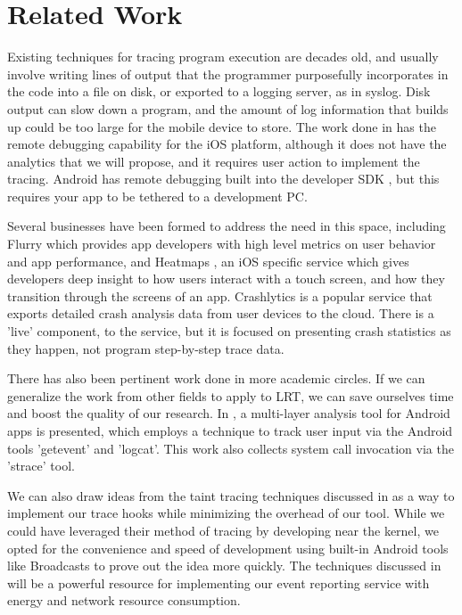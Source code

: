 \documentclass{acm_proc_article-sp}
\begin{document}
\section{Related Work}
Existing techniques for tracing program execution are decades old, and usually 
involve writing lines of output that the programmer purposefully incorporates 
in the code into a file on disk, or exported to a logging server, as in syslog. 
Disk output can slow down a program, and the amount of log information that 
builds up could be too large for the mobile device to store. The work done in 
\cite{NSLogger} has the remote debugging capability for the iOS platform, although 
it does not have the analytics that we will propose, and it requires user action 
to implement the tracing. Android has remote debugging built into the developer 
SDK \cite{AndroidRemoteDebugTool}, but this requires your app to be tethered to a development PC.

Several businesses have been formed to address the need in this space, including
Flurry \cite{Flurry} which provides app developers with high level metrics on
user behavior and app performance, and Heatmaps \cite{Heatmaps}, an iOS specific
service which gives developers deep insight to how users interact with a touch
screen, and how they transition through the screens of an app. 
Crashlytics \cite{Crashlytics} is a popular service that exports detailed
crash analysis data from user devices to the cloud. There is a 'live' component,
to the service, but it is focused on presenting crash statistics as they happen,
not program step-by-step trace data.

There has also been pertinent work done in more academic circles. If we can 
generalize the work from other fields to apply to LRT, we can save ourselves 
time and boost the quality of our research. In \cite{ProfileDroid}, a 
multi-layer analysis tool for Android apps is presented, which employs a 
technique to track user input via the Android tools 'getevent' and 'logcat'. 
This work also collects system call invocation via the 'strace' tool. 

We can also draw ideas from the taint tracing techniques discussed in 
\cite{TaintDroid} as a way to implement our trace hooks while minimizing 
the overhead of our tool. While we could have leveraged their method of 
tracing by developing near the kernel, we opted for the convenience and 
speed of development using built-in Android tools like Broadcasts to prove
out the idea more quickly. The techniques discussed in \cite{PeriodicTransfers}
will be a powerful resource for implementing our event reporting service 
with energy and network resource consumption.
\end{document}
